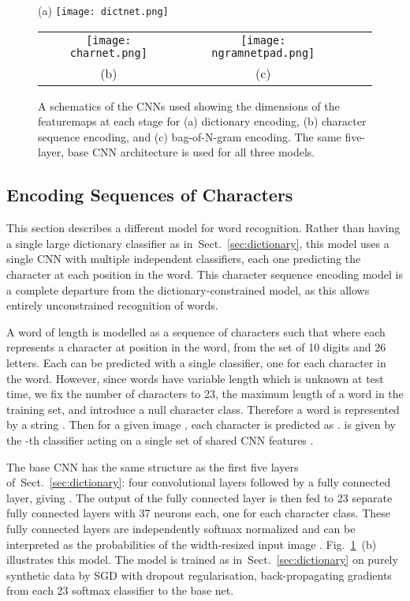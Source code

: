 \documentclass{article} \usepackage{nips14submit_e,times}
\newcommand{\figref}[1]{Fig.~\ref{#1}}
\newcommand{\sref}[1]{Sect.~\ref{#1}}
\begin{document}
\begin{figure}[t]
\centering
\vspace{-1em}
(a)
\texttt{[image: dictnet.png]}
\begin{tabular}{cccc}
\texttt{[image: charnet.png]}&
\texttt{[image: ngramnetpad.png]}
\vspace{-2em}
\\
(b)&(c)
\end{tabular}
\vspace{-1em}
\caption{A schematics of the CNNs used showing the dimensions of the featuremaps at each stage for (a) dictionary encoding, (b) character sequence encoding, and (c) bag-of-N-gram encoding. The same five-layer, base CNN architecture is used for all three models.}
\label{fig:dictnet}
\end{figure}

\subsection{Encoding Sequences of Characters}\label{sec:characters}
This section describes a different model for word recognition. Rather than having a single large dictionary classifier as in~\sref{sec:dictionary}, this model uses a single CNN with multiple independent classifiers, each one predicting the character at each position in the word. 
This character sequence encoding model is a complete departure from the dictionary-constrained model, as this allows entirely unconstrained recognition of words.

A word  of length  is modelled as a sequence of characters such that  where each  represents a character at position  in the word, from the set of 10 digits and 26 letters. Each  can be predicted with a single classifier, one for each character in the word. However, since words have variable length  which is unknown at test time, we fix the number of characters to 23, the maximum length of a word in the training set, and introduce a null character class. Therefore a word is represented by a string . Then for a given image , each character is predicted as .  is given by the -th classifier acting on a single set of shared CNN features . 

The base CNN has the same structure as the first five layers of~\sref{sec:dictionary}: four convolutional layers followed by a fully connected layer, giving . The output of the fully connected layer is then fed to 23 separate fully connected layers with 37 neurons each, one for each character class. These fully connected layers are independently softmax normalized and can be interpreted as the probabilities  of the width-resized input image . \figref{fig:dictnet}~(b) illustrates this model.
The model is trained as in~\sref{sec:dictionary} on purely synthetic data by SGD with dropout regularisation, back-propagating gradients from each 23 softmax classifier to the base net.
\end{document}
